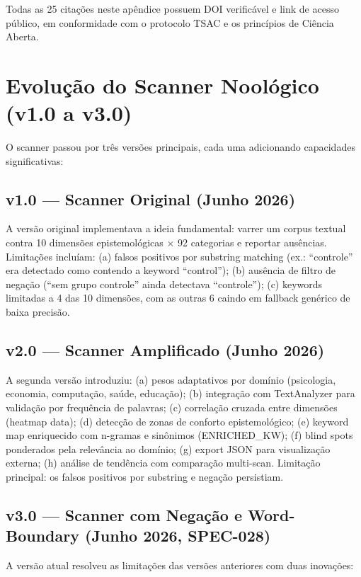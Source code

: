 Todas as 25 citações neste apêndice possuem DOI verificável e link de acesso público, em conformidade com o protocolo TSAC e os princípios de Ciência Aberta.

\section{Evolução do Scanner Noológico (v1.0 a v3.0)}

O scanner passou por três versões principais, cada uma adicionando capacidades significativas:

\subsection{v1.0 — Scanner Original (Junho 2026)}

A versão original implementava a ideia fundamental: varrer um corpus textual contra 10 dimensões epistemológicas $\times$ 92 categorias e reportar ausências. Limitações incluíam: (a) falsos positivos por substring matching (ex.: ``controle'' era detectado como contendo a keyword ``control''); (b) ausência de filtro de negação (``sem grupo controle'' ainda detectava ``controle''); (c) keywords limitadas a 4 das 10 dimensões, com as outras 6 caindo em fallback genérico de baixa precisão.

\subsection{v2.0 — Scanner Amplificado (Junho 2026)}

A segunda versão introduziu: (a) pesos adaptativos por domínio (psicologia, economia, computação, saúde, educação); (b) integração com TextAnalyzer para validação por frequência de palavras; (c) correlação cruzada entre dimensões (heatmap data); (d) detecção de zonas de conforto epistemológico; (e) keyword map enriquecido com n-gramas e sinônimos (ENRICHED\_KW); (f) blind spots ponderados pela relevância ao domínio; (g) export JSON para visualização externa; (h) análise de tendência com comparação multi-scan. Limitação principal: os falsos positivos por substring e negação persistiam.

\subsection{v3.0 — Scanner com Negação e Word-Boundary (Junho 2026, SPEC-028)}

A versão atual resolveu as limitações das versões anteriores com duas inovações:

